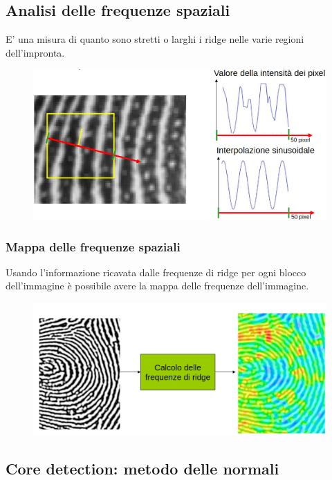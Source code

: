 \documentclass{report}
\begin{document}
\newpage
\subsection{Analisi delle frequenze spaziali}

E’ una misura di quanto sono stretti o larghi i
ridge nelle varie regioni dell’impronta.

\begin{figure}[ht]
    \centering
    \includegraphics[width=1\linewidth]{images/ridge-freq.png}
\end{figure}

\subsubsection{Mappa delle frequenze spaziali}

Usando l’informazione ricavata dalle frequenze di
ridge per ogni blocco dell’immagine è possibile
avere la mappa delle frequenze dell’immagine.

\begin{figure}[ht]
    \centering
    \includegraphics[width=1\linewidth]{images/spazio-freq.png}
\end{figure}

\newpage
\subsection{Core detection: metodo delle normali}
\end{document}
